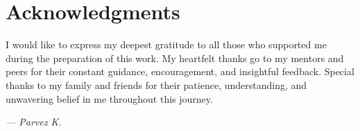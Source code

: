 \chapter*{Acknowledgments}

\thispagestyle{plain}
\vspace{1cm}

I would like to express my deepest gratitude to all those who supported me during the preparation of this work.  
My heartfelt thanks go to my mentors and peers for their constant guidance, encouragement, and insightful feedback.  
Special thanks to my family and friends for their patience, understanding, and unwavering belief in me throughout this journey.

\vfill
\begin{flushright}
    \textit{— Parvez K.}
\end{flushright}
